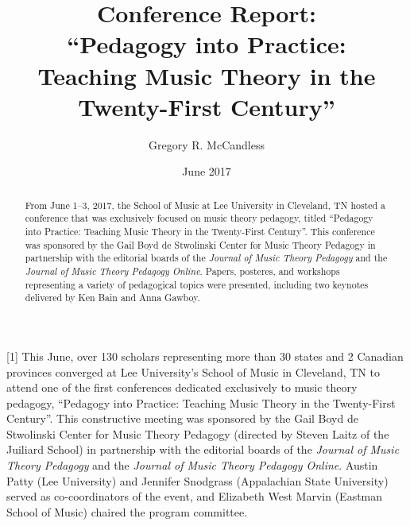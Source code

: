 \documentclass[oneside,12pt]{article}
\begin{document}
    
\title{Conference Report:\\``Pedagogy into Practice:\\ Teaching Music Theory in the Twenty-First Century''}
\author{Gregory R. McCandless}
\date{June 2017}
\maketitle

\begin{abstract}
From June 1--3, 2017, the School of Music at Lee University in Cleveland, TN hosted a conference that was exclusively focused on music theory pedagogy, titled ``Pedagogy into Practice: Teaching Music Theory in the Twenty-First Century''. This conference was sponsored by the Gail Boyd de Stwolinski Center for Music Theory Pedagogy in partnership with the editorial boards of the \textit{Journal of Music Theory Pedagogy} and the \textit{Journal of Music Theory Pedagogy Online}. Papers, posteres, and workshops representing a variety of pedagogical topics were presented, including two keynotes delivered by Ken Bain and Anna Gawboy.
\end{abstract}

[1] This June, over 130 scholars representing more than 30 states and 2 Canadian provinces converged at Lee University's School of Music in Cleveland, TN to attend one of the first conferences dedicated exclusively to music theory pedagogy, ``Pedagogy into Practice: Teaching Music Theory in the Twenty-First Century''. This constructive meeting was sponsored by the Gail Boyd de Stwolinski Center for Music Theory Pedagogy (directed by Steven Laitz of the Juiliard School) in partnership with the editorial boards of the \textit{Journal of Music Theory Pedagogy} and the \textit{Journal of Music Theory Pedagogy Online}. Austin Patty (Lee University) and Jennifer Snodgrass (Appalachian State University) served as co-coordinators of the event, and Elizabeth West Marvin (Eastman School of Music) chaired the program committee. \par 
\end{document}
